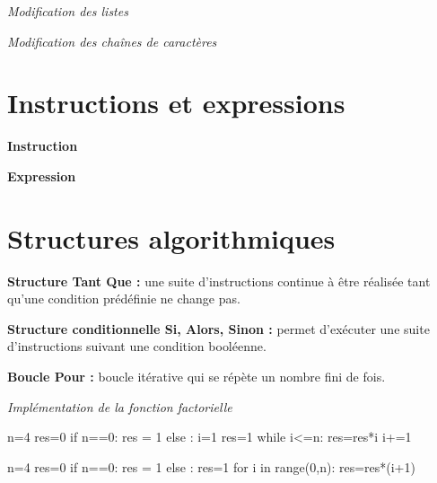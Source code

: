 \documentclass[10pt]{article}
\begin{document}
\begin{exemple}
\textit{Modification des listes}

\textit{Modification des chaînes de caractères}

\end{exemple}
\section{Instructions et expressions}

\begin{defi}
\textbf{Instruction}

\textbf{Expression}
\end{defi}

\begin{exemple}


\end{exemple}

\section{Structures algorithmiques}
\begin{defi}
\begin{minipage}[t]{.32\linewidth}
\noindent \textbf{Structure Tant Que :} une suite d'instructions continue à être réalisée tant qu'une condition prédéfinie ne change pas.
\end{minipage} \hfill
\begin{minipage}[t]{.32\linewidth}
\noindent \textbf{Structure conditionnelle Si, Alors, Sinon :} permet d'exécuter une suite d'instructions suivant une condition booléenne.
\end{minipage} \hfill
\begin{minipage}[t]{.32\linewidth}
\noindent \textbf{Boucle Pour :}  boucle itérative qui se répète un nombre fini de fois.
\end{minipage} 
\end{defi}

\begin{exemple}
\textit{Implémentation de la fonction factorielle}

\begin{py}
\begin{minipage}[t]{.48\linewidth}
\begin{python}
n=4
res=0
if n==0:
    res = 1
else :
    i=1    
    res=1
    while i<=n:
        res=res*i
        i+=1
\end{python}
\end{minipage} \hfill
\begin{minipage}[t]{.48\linewidth}
\begin{python}
n=4
res=0
if n==0:
    res = 1
else :
    res=1    
    for i in range(0,n):
        res=res*(i+1)
\end{python}
\end{minipage} 
\end{py}
\end{exemple}
\end{document}
